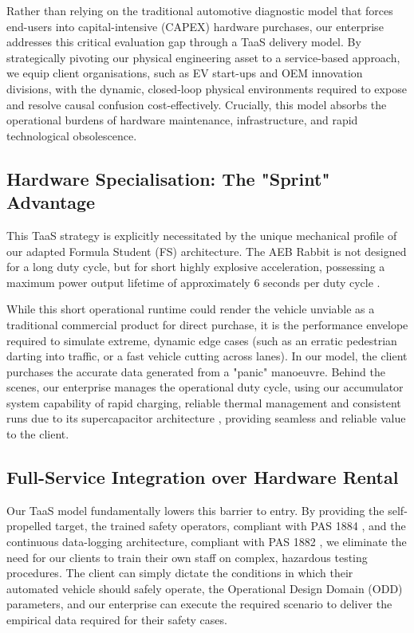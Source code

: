 Rather than relying on the traditional automotive diagnostic model that forces end-users into capital-intensive (CAPEX) hardware purchases, our enterprise addresses this critical evaluation gap through a TaaS delivery model. By strategically pivoting our physical engineering asset to a service-based approach, we equip client organisations, such as EV start-ups and OEM innovation divisions, %
with the dynamic, closed-loop physical environments required to expose and resolve causal confusion cost-effectively. Crucially, this model absorbs the operational burdens of hardware maintenance, infrastructure, and rapid technological obsolescence.

\subsection{Hardware Specialisation: The "Sprint" Advantage}

This TaaS strategy is explicitly necessitated by the unique mechanical profile of our adapted Formula Student (FS) architecture. The AEB Rabbit is not designed for a long duty cycle, but for short highly explosive acceleration, possessing a maximum power output lifetime of approximately 6 seconds per duty cycle %
.

While this short operational runtime could render the vehicle unviable as a traditional commercial product for direct purchase, it is the performance envelope required to simulate extreme, dynamic edge cases (such as an erratic pedestrian darting into traffic, or a fast vehicle cutting across lanes). In our model, the client purchases the accurate data generated from a "panic" manoeuvre. Behind the scenes, our enterprise manages the operational duty cycle, using our accumulator system capability of rapid charging, reliable thermal management and consistent runs due to its supercapacitor architecture %
, providing seamless and reliable value to the client.

\subsection{Full-Service Integration over Hardware Rental}

Our TaaS model fundamentally lowers this barrier to entry. By providing the self-propelled target, the trained safety operators, compliant with PAS 1884 \cite{pas1884}, and the continuous data-logging architecture, compliant with PAS 1882 \cite{pas1882}, we eliminate the need for our clients to train their own staff on complex, hazardous testing procedures. The client can simply dictate the conditions in which their automated vehicle should safely operate, the Operational Design Domain (ODD) parameters, and our enterprise can execute the required scenario to deliver the empirical data required for their safety cases.

